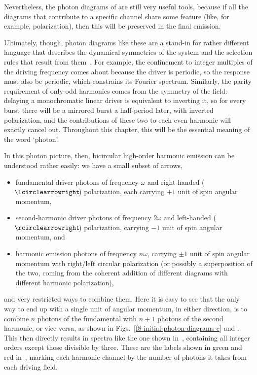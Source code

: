 Nevertheless, the photon diagrams of  are still very useful tools, because if all the diagrams that contribute to a specific channel share some feature (like, for example, polarization), then this will be preserved in the final emission. 

Ultimately, though, photon diagrams like these are a stand-in for rather different language that describes the dynamical symmetries of the system and the selection rules that result from them~\cite{SelectionRulesInHHG, averbukh_stability_2002}. For example, the confinement to integer multiples of the driving frequency comes about because the driver is periodic, so the response must also be periodic, which constrains its Fourier spectrum. Similarly, the parity requirement of only-odd harmonics comes from the symmetry of the field: delaying a monochromatic linear driver is equivalent to inverting it, so for every burst there will be a mirrored burst a half-period later, with inverted polarization, and the contributions of these two to each even harmonic will exactly cancel out. Throughout this chapter, this will be the essential meaning of the word `photon'.




In this photon picture, then, bicircular high-order harmonic emission can be understood rather easily: we have a small subset of arrows, 
\begin{itemize}
  \item fundamental driver photons of frequency $\omega$ and right-handed (${\rightpol}\!$) polarization, each carrying $+1$ unit of spin angular momentum, 
  \item second-harmonic driver photons of frequency $2\omega$ and left-handed (${\leftpol}\!$) polarization, carrying $-1$ unit of spin angular momentum, and 
  \item harmonic emission photons of frequency $n\omega$, carrying $\pm1$ unit of spin angular momentum with right/left circular polarization (or possibly a superposition of the two, coming from the coherent addition of different diagrams with different harmonic polarization),
\end{itemize}
and very restricted ways to combine them. Here it is easy to see that the only way to end up with a single unit of angular momentum, in either direction, is to combine $n$ photons of the fundamental with $n+1$ photons of the second harmonic, or vice versa, as shown in Figs.~\ref{f8-initial-photon-diagrams-c} and \protect{}. This then directly results in spectra like the one shown in~, containing all integer orders except those divisible by three. These are the labels shown in green and red in~, marking each harmonic channel by the number of photons it takes from each driving field.


